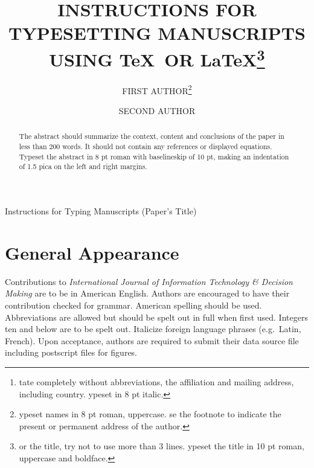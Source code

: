 \documentclass{ws-ijitdm}
\begin{document}
{Instructions for Typing Manuscripts (Paper's Title)}


\title{INSTRUCTIONS FOR TYPESETTING MANUSCRIPTS\\
USING \TeX\ OR \LaTeX\footnote{or the title, try 
not to use more than 3 lines.
ypeset the title in 10 pt roman, uppercase and
boldface.}
}

\author{\footnotesize FIRST AUTHOR\footnote{
ypeset names in 8 pt roman, uppercase. se the footnote to 
indicate the present or permanent address of the author.}}

\address{University Department, University Name, Address\\
City, State ZIP/Zone,
Country\footnote{tate completely without abbreviations, the
affiliation and mailing address, including country. ypeset in 8 pt
italic.}
}

\author{SECOND AUTHOR}

\address{Group, Laboratory, Address\\
City, State ZIP/Zone, Country
}

\maketitle

\begin{history}
\end{history}

\begin{abstract}
The abstract should summarize the context, content
and conclusions of the paper in less than 200 words. It should
not contain any references or displayed equations. Typeset the
abstract in 8 pt roman with baselineskip of 10 pt, making
an indentation of 1.5 pica on the left and right margins.

\end{abstract}

\section{General Appearance}	

Contributions to {\it International Journal of Information Technology
\& Decision}\break 
{\it Making} are to be in American English. Authors are
encouraged to have their contribution checked for grammar. American
spelling should be used. Abbreviations are allowed but should be spelt
out in full when first used. Integers ten and below are to be spelt
out.  Italicize foreign language phrases (e.g.~Latin, French).  Upon
acceptance, authors are required to submit their data source file
including postscript files for figures.
\end{document}
